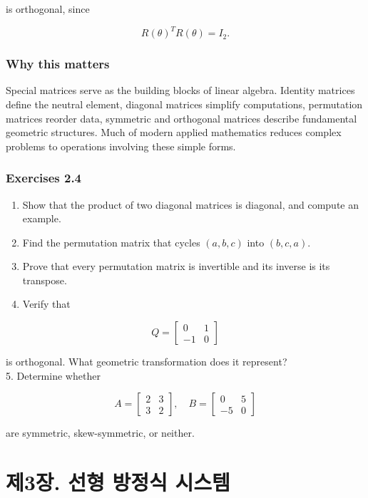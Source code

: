 \documentclass[
  12pt,
  a4paper,
]{article}
\let\oldsection\section
\renewcommand{\section}{\clearpage\oldsection}
\begin{document}
is orthogonal, since

\[R(\theta)^T R(\theta) = I_2.\]

\subsubsection{Why this matters}\label{why-this-matters-7}

Special matrices serve as the building blocks of linear algebra.
Identity matrices define the neutral element, diagonal matrices simplify
computations, permutation matrices reorder data, symmetric and
orthogonal matrices describe fundamental geometric structures. Much of
modern applied mathematics reduces complex problems to operations
involving these simple forms.

\subsubsection{Exercises 2.4}\label{exercises-24}

\begin{enumerate}
\def\labelenumi{\arabic{enumi}.}
\item
  Show that the product of two diagonal matrices is diagonal, and
  compute an example.
\item
  Find the permutation matrix that cycles \((a,b,c)\) into \((b,c,a)\).
\item
  Prove that every permutation matrix is invertible and its inverse is
  its transpose.
\item
  Verify that
\end{enumerate}

\[Q = \begin{bmatrix} 0 & 1 \\ -1 & 0 \end{bmatrix}\]

is orthogonal. What geometric transformation does it represent?\\
5. Determine whether

\[A = \begin{bmatrix} 2 & 3 \\ 3 & 2 \end{bmatrix}, \quad
B = \begin{bmatrix} 0 & 5 \\ -5 & 0 \end{bmatrix}\]

are symmetric, skew-symmetric, or neither.

\section{제3장. 선형 방정식 시스템}\label{chapter-3-systems-of-linear-equations}
\end{document}
